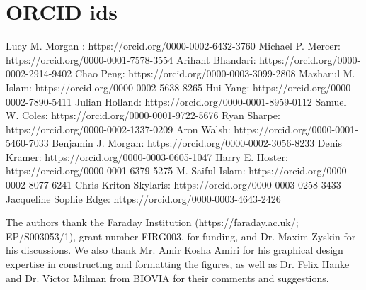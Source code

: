 \documentclass[journal=jacsat,manuscript=article]{achemso}
\begin{document}
\section*{ORCID ids}
Lucy M. Morgan : https://orcid.org/0000-0002-6432-3760 \newline
Michael P. Mercer: https://orcid.org/0000-0001-7578-3554 \newline
Arihant Bhandari: https://orcid.org/0000-0002-2914-9402 \newline
Chao Peng: https://orcid.org/0000-0003-3099-2808 \newline
Mazharul M. Islam: https://orcid.org/0000-0002-5638-8265 \newline
Hui Yang: https://orcid.org/0000-0002-7890-5411 \newline
Julian Holland: https://orcid.org/0000-0001-8959-0112 \newline
Samuel W. Coles: https://orcid.org/0000-0001-9722-5676 \newline
Ryan Sharpe: https://orcid.org/0000-0002-1337-0209 \newline
Aron Walsh: https://orcid.org/0000-0001-5460-7033 \newline
Benjamin J. Morgan: https://orcid.org/0000-0002-3056-8233 \newline
Denis Kramer: https://orcid.org/0000-0003-0605-1047 \newline
Harry E. Hoster: https://orcid.org/0000-0001-6379-5275 \newline
M. Saiful Islam: https://orcid.org/0000-0002-8077-6241 \newline
Chris-Kriton Skylaris: https://orcid.org/0000-0003-0258-3433 \newline
Jacqueline Sophie Edge: https://orcid.org/0000-0003-4643-2426 \newline

\begin{acknowledgement}
The authors thank the Faraday Institution (https://faraday.ac.uk/; EP/S003053/1), grant number FIRG003, for funding, and Dr. Maxim Zyskin for his discussions. We also thank Mr. Amir Kosha Amiri for his graphical design expertise in constructing and formatting the figures, as well as Dr. Felix Hanke and Dr. Victor Milman from BIOVIA for their comments and suggestions. 


\end{acknowledgement}
\end{document}

